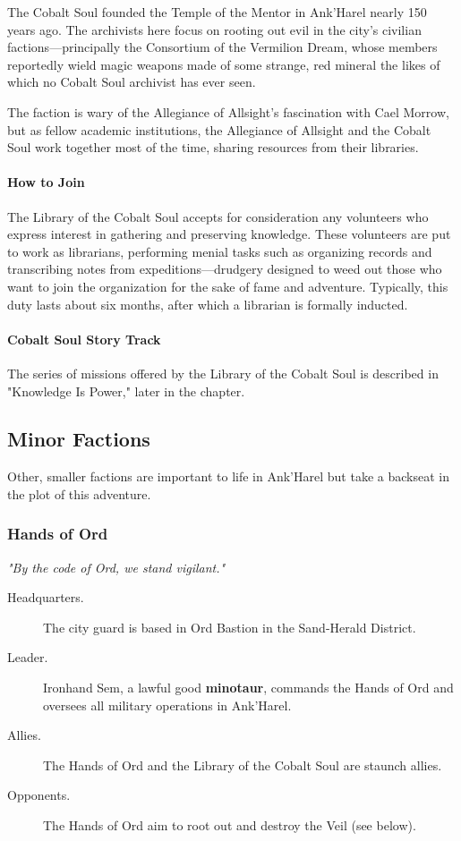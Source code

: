 \documentclass[letterpaper, 11pt, bg=full, twocolumn]{dndbook}
\begin{document}
The Cobalt Soul founded the Temple of the Mentor in Ank'Harel nearly 150 years ago. The archivists here focus on rooting out evil in the city's civilian factions---principally the Consortium of the Vermilion Dream, whose members reportedly wield magic weapons made of some strange, red mineral the likes of which no Cobalt Soul archivist has ever seen.

The faction is wary of the Allegiance of Allsight's fascination with Cael Morrow, but as fellow academic institutions, the Allegiance of Allsight and the Cobalt Soul work together most of the time, sharing resources from their libraries.

\paragraph{How to Join}

The Library of the Cobalt Soul accepts for consideration any volunteers who express interest in gathering and preserving knowledge. These volunteers are put to work as librarians, performing menial tasks such as organizing records and transcribing notes from expeditions---drudgery designed to weed out those who want to join the organization for the sake of fame and adventure. Typically, this duty lasts about six months, after which a librarian is formally inducted.

\paragraph{Cobalt Soul Story Track}

The series of missions offered by the Library of the Cobalt Soul is described in "Knowledge Is Power," later in the chapter.

\subsection{Minor Factions}

Other, smaller factions are important to life in Ank'Harel but take a backseat in the plot of this adventure.

\subsubsection{Hands of Ord}

\textit{"By the code of Ord, we stand vigilant."}

\begin{description}
\item[Headquarters.] The city guard is based in Ord Bastion in the Sand-Herald District.
\item[Leader.] Ironhand Sem, a lawful good \textbf{minotaur}, commands the Hands of Ord and oversees all military operations in Ank'Harel.
\item[Allies.] The Hands of Ord and the Library of the Cobalt Soul are staunch allies.
\item[Opponents.] The Hands of Ord aim to root out and destroy the Veil (see below).
\end{description}
\end{document}
